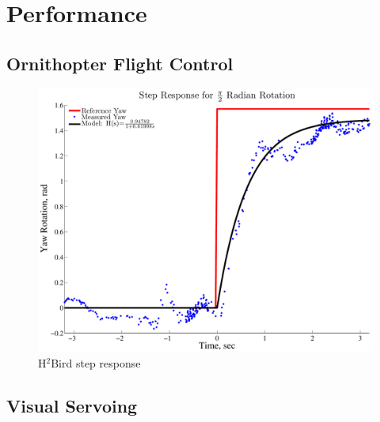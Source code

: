 \documentclass[letterpaper, 10 pt, conference]{ieeeconf}
\begin{document}

\section{Performance}

\subsection{Ornithopter Flight Control}
\begin{figure}[tb]
\centering
\includegraphics[width=\linewidth]{figures/step_response_total.pdf}
\caption{H$^2$Bird step response}
\label{fig:step_response}
\end{figure}

\subsection{Visual Servoing}
\end{document}
